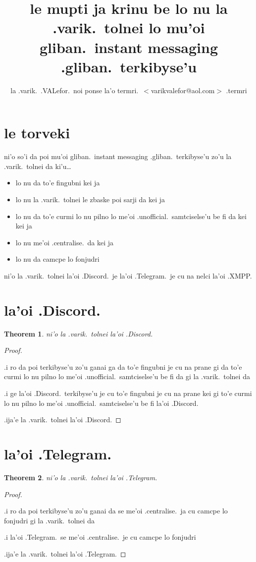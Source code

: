 \documentclass{article}
\title{le mupti ja krinu be lo nu la .varik.\ tolnei lo mu'oi gliban.\ instant messaging .gliban.\ terkibyse'u}
\author{la .varik.\ .VALefor.\ noi ponse la'o termri.\ $<$varikvalefor@aol.com$>$ .termri}
\newtheorem{thm}{Theorem}
\begin{document}
\maketitle

\section{le torveki}
ni'o so'i da poi mu'oi gliban.\ instant messaging .gliban.\ terkibyse'u zo'u la .varik.\ tolnei da ki'u\ldots
\begin{itemize}
	\item lo nu da to'e fingubni kei ja
	\item lo nu la .varik.\ tolnei le zbaske poi sarji da kei ja
	\item lo nu da to'e curmi lo nu pilno lo me'oi .unofficial.\ samtciselse'u be fi da kei kei ja
	\item lo nu me'oi .centralise.\ da kei ja
	\item lo nu da camcpe lo fonjudri
\end{itemize}

ni'o la .varik.\ tolnei la'oi .Discord.\ je la'oi .Telegram.\ je cu na nelci la'oi .XMPP.
\section{la'oi .Discord.}
\begin{thm}
	ni'o la .varik.\ tolnei la'oi .Discord.
\end{thm}
\begin{proof}
	${}$

	.i ro da poi terkibyse'u zo'u ganai ga da to'e fingubni je cu na prane gi da to'e curmi lo nu pilno lo me'oi .unofficial.\ samtciselse'u be fi da gi la .varik.\ tolnei da

	.i ge la'oi .Discord.\ terkibyse'u je cu to'e fingubni je cu na prane kei gi to'e curmi lo nu pilno lo me'oi .unofficial.\ samtciselse'u be fi la'oi .Discord.

	.ija'e la .varik.\ tolnei la'oi .Discord.
\end{proof}

\section{la'oi .Telegram.}
\begin{thm}
	ni'o la .varik.\ tolnei la'oi .Telegram.
\end{thm}
\begin{proof}
	${}$

	.i ro da poi terkibyse'u zo'u ganai da se me'oi .centralise.\ ja cu camcpe lo fonjudri gi la .varik.\ tolnei da

	.i la'oi .Telegram.\ se me'oi .centralise.\ je cu camcpe lo fonjudri

	.ija'e la .varik.\ tolnei la'oi .Telegram.
\end{proof}
\end{document}

